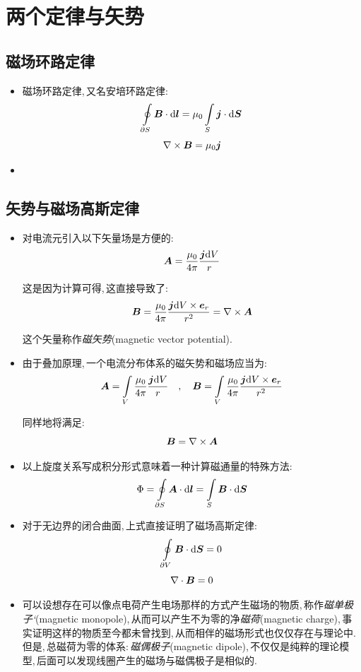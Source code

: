 \section{两个定律与矢势}

\subsection{磁场环路定律}

\begin{itemize}

\item 磁场环路定律,\,又名安培环路定律:
\[\oint\limits_{\partial S}\boldsymbol{B}\cdot \textrm{d} \boldsymbol{l}=\mu_0 \int\limits_S\boldsymbol{j}\cdot \textrm{d} \boldsymbol{S}\]
\[\nabla\times \boldsymbol{B}=\mu_0 \boldsymbol{j}\]

\item 
\end{itemize}

\subsection{矢势与磁场高斯定律}

\begin{itemize}

\item 对电流元引入以下矢量场是方便的:
\[\boldsymbol{A}=\frac{\mu_0}{4\pi}\frac{\boldsymbol{j}\textrm{d} V}{r}\]

这是因为计算可得,\,这直接导致了:
\[\boldsymbol{B}=\frac{\mu_0}{4\pi}\frac{\boldsymbol{j}\textrm{d} V\times \boldsymbol{e}_r}{r^2}=\nabla\times \boldsymbol{A}\]

这个矢量称作\emph{磁矢势}(magnetic vector potential).

\item 由于叠加原理,\,一个电流分布体系的磁矢势和磁场应当为:
\[\boldsymbol{A}=\int\limits_V \frac{\mu_0}{4\pi}\frac{\boldsymbol{j}\textrm{d} V}{r}\quad ,\quad \boldsymbol{B}=\int\limits_V \frac{\mu_0}{4\pi}\frac{\boldsymbol{j}\textrm{d} V\times \boldsymbol{e}_r}{r^2}\]

同样地将满足:
\[\boldsymbol{B}=\nabla\times \boldsymbol{A}\]

\item 以上旋度关系写成积分形式意味着一种计算磁通量的特殊方法:
\[\Phi=\oint\limits_{\partial S} \boldsymbol{A}\cdot \textrm{d} \boldsymbol{l}=\int\limits_S\boldsymbol{B}\cdot \textrm{d} \boldsymbol{S}\]


\item 对于无边界的闭合曲面,\,上式直接证明了磁场高斯定律:
\[\oint\limits_{\partial V}\boldsymbol{B}\cdot \textrm{d} \boldsymbol{S}=0\]
\[\nabla\cdot \boldsymbol{B}=0\]

\item 可以设想存在可以像点电荷产生电场那样的方式产生磁场的物质,\,称作\emph{磁单极子`}(magnetic monopole),\,从而可以产生不为零的净\emph{磁荷}(magnetic charge),\,事实证明这样的物质至今都未曾找到,\,从而相伴的磁场形式也仅仅存在与理论中.\,但是,\,总磁荷为零的体系:\,\emph{磁偶极子}(magnetic dipole),\,不仅仅是纯粹的理论模型,\,后面可以发现线圈产生的磁场与磁偶极子是相似的.
\end{itemize}


